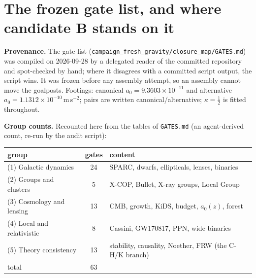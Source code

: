 \documentclass[10pt]{article}
\newcommand{\fpath}[1]{\nolinkurl{#1}}
\begin{document}
\begin{abstract}
(iv)~Lean certifies 161 theorems: that stated conclusions follow from stated premises, no empirical fact. (v)~What decides the rest: Gaia DR4 wide binaries (2~December 2026), which can separate B only from the bare MOND law; $a_0$ at $z\approx2.5$ (not testable with the data on disk; the PHIBSS sample is empty under the pre-registered selection); and multi-epoch ultra-faint data. The document is a map, not a result.
\end{abstract}

\section{The frozen gate list, and where candidate B stands on it}\label{sec:gates}

\textbf{Provenance.} The gate list (\fpath{campaign_fresh_gravity/closure_map/GATES.md}) was compiled on 2026-09-28 by a delegated reader of the committed repository and spot-checked by hand; where it disagrees with a committed script output, the script wins. It was frozen before any assembly attempt, so an assembly cannot move the goalposts. Footings: canonical $a_0=9.3603\times10^{-11}$ and alternative $a_0=1.1312\times10^{-10}$\,m\,s$^{-2}$; pairs are written canonical/alternative; $\kappa=\tfrac12$ is fitted throughout.

\textbf{Group counts.} Recounted here from the tables of \fpath{GATES.md} (an agent-derived count, re-run by the audit script):
\begin{center}
\begin{tabular}{lcl}
\toprule
group & gates & content \\
\midrule
(1) Galactic dynamics & 24 & SPARC, dwarfs, ellipticals, lenses, binaries \\
(2) Groups and clusters & 5 & X-COP, Bullet, X-ray groups, Local Group \\
(3) Cosmology and lensing & 13 & CMB, growth, KiDS, budget, $a_0(z)$, forest \\
(4) Local and relativistic & 8 & Cassini, GW170817, PPN, wide binaries \\
(5) Theory consistency & 13 & stability, causality, Noether, FRW (the C-H/K branch) \\
total & 63 & \\
\bottomrule
\end{tabular}
\end{center}
\end{document}
